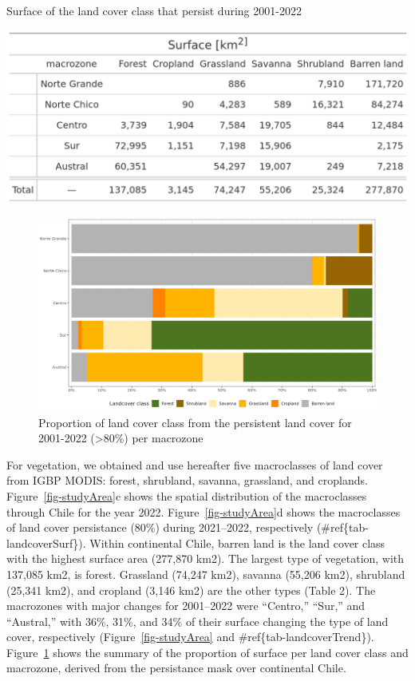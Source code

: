 \documentclass[
  authoryear,
  preprint,
  3p,
  onecolumn]{elsarticle}
\begin{document}
\begin{table}[!ht]
\caption{Surface of the land cover class that persist during 2001-2022}
\label{tab-landcoverSurf}
\includegraphics[width = .5\textwidth]{../output/figs/table_surface_landcover_macrozone.png}
\end{table}

\begin{figure}[!ht]

{\centering \includegraphics{../output/figs/LC_pers80_per_macrozone.png}

}

\caption{\label{fig-LCprop}Proportion of land cover class from the
persistent land cover for 2001-2022 (\textgreater80\%) per macrozone}

\end{figure}

For vegetation, we obtained and use hereafter five macroclasses of land
cover from IGBP MODIS: forest, shrubland, savanna, grassland, and
croplands. Figure~\ref{fig-studyArea}c shows the spatial distribution of
the macroclasses through Chile for the year 2022.
Figure~\ref{fig-studyArea}d shows the macroclasses of land cover
persistance (80\%) during 2021--2022, respectively
(\#ref\{tab-landcoverSurf\}). Within continental Chile, barren land is
the land cover class with the highest surface area (277,870 km2). The
largest type of vegetation, with 137,085 km2, is forest. Grassland
(74,247 km2), savanna (55,206 km2), shrubland (25,341 km2), and cropland
(3,146 km2) are the other types (Table 2). The macrozones with major
changes for 2001--2022 were ``Centro,'' ``Sur,'' and ``Austral,'' with
36\%, 31\%, and 34\% of their surface changing the type of land cover,
respectively (Figure~\ref{fig-studyArea} and
\#ref\{tab-landcoverTrend\}). Figure~\ref{fig-LCprop} shows the summary
of the proportion of surface per land cover class and macrozone, derived
from the persistance mask over continental Chile.
\end{document}
